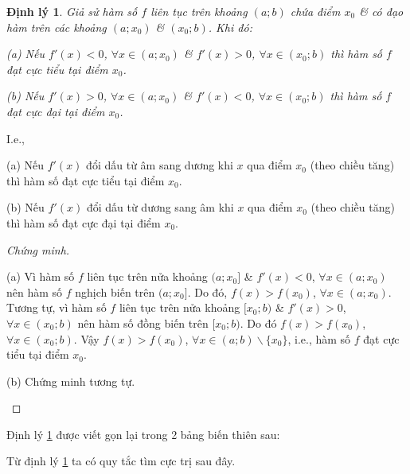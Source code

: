 \documentclass{article}
\numberwithin{equation}{section}
\newtheorem{dinhly}{Định lý}[section]
\begin{document}
\begin{dinhly}
	\label{thm:dieu kien du de ham so dat cuc tri}
	Giả sử hàm số $f$ liên tục trên khoảng $(a;b)$ chứa điểm $x_0$ \& có đạo hàm trên các khoảng $(a;x_0)$ \& $(x_0;b)$. Khi đó:
	\begin{enumerate*}
		\item[(a)] Nếu $f'(x) < 0$, $\forall x\in(a;x_0)$ \& $f'(x) > 0$, $\forall x\in(x_0;b)$ thì hàm số $f$ đạt cực tiểu tại điểm $x_0$.
		\item[(b)] Nếu $f'(x) > 0$, $\forall x\in(a;x_0)$ \& $f'(x) < 0$, $\forall x\in(x_0;b)$ thì hàm số $f$ đạt cực đại tại điểm $x_0$.
	\end{enumerate*}
\end{dinhly}
I.e.,
\begin{enumerate*}
	\item[(a)] Nếu $f'(x)$ đổi dấu từ âm sang dương khi $x$ qua điểm $x_0$  (theo chiều tăng) thì hàm số đạt cực tiểu tại điểm $x_0$.
	\item[(b)] Nếu $f'(x)$ đổi dấu từ dương sang âm khi $x$ qua điểm $x_0$ (theo chiều tăng) thì hàm số đạt cực đại tại điểm $x_0$.
\end{enumerate*}

\begin{proof}[Chứng minh]
	\begin{enumerate*}
		\item[(a)] Vì hàm số $f$ liên tục trên nửa khoảng $(a;x_0]$ \& $f'(x) < 0$, $\forall x\in(a;x_0)$ nên hàm số $f$ nghịch biến trên $(a;x_0]$. Do đó, $f(x) > f(x_0)$, $\forall x\in(a;x_0)$. Tương tự, vì hàm số $f$ liên tục trên nửa khoảng $[x_0;b)$ \& $f'(x) > 0$, $\forall x\in(x_0;b)$ nên hàm số đồng biến trên $[x_0;b)$. Do đó $f(x) > f(x_0)$, $\forall x\in(x_0;b)$. Vậy $f(x) > f(x_0)$, $\forall x\in(a;b)\backslash\{x_0\}$, i.e., hàm số $f$ đạt cực tiểu tại điểm $x_0$.
		\item[(b)] Chứng minh tương tự.
	\end{enumerate*}
\end{proof}
Định lý \ref{thm:dieu kien du de ham so dat cuc tri} được viết gọn lại trong 2 bảng biến thiên sau:

\begin{center}
	\hspace{1cm}
\end{center}
Từ định lý \ref{thm:dieu kien du de ham so dat cuc tri} ta có quy tắc tìm cực trị sau đây.
\end{document}
